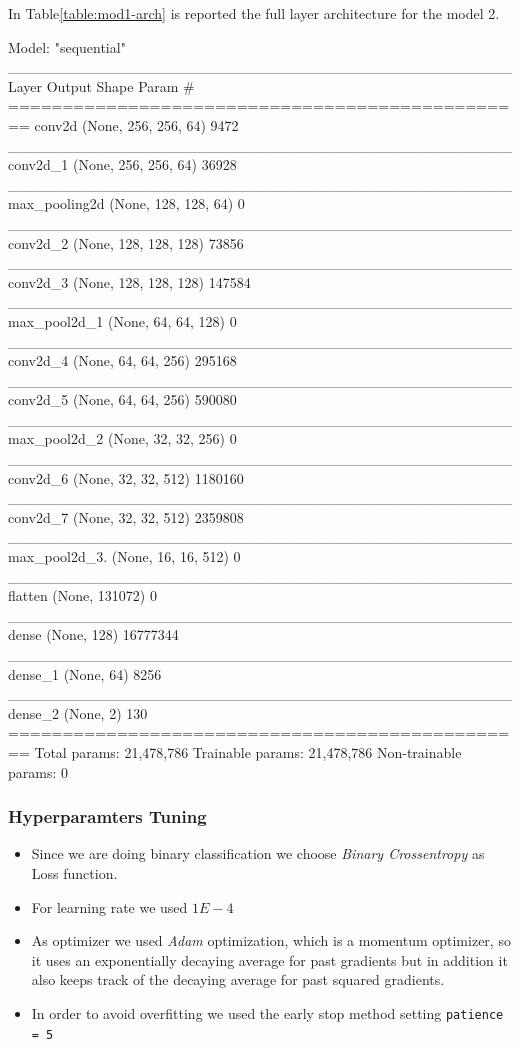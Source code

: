 \documentclass[conference]{IEEEtran}
\begin{document}
In Table\ref{table:mod1-arch} is reported the full layer architecture for the model 2.
\begin{table}[ht!] %
\centering
\caption{Layer Architecture}
\begin{verbnobox}[\fontsize{8pt}{8pt}\selectfont]
Model: "sequential"
________________________________________________
Layer           Output Shape           Param #   
================================================
conv2d         (None, 256, 256, 64)    9472      
________________________________________________
conv2d_1       (None, 256, 256, 64)    36928     
________________________________________________
max_pooling2d  (None, 128, 128, 64)    0         
________________________________________________
conv2d_2       (None, 128, 128, 128)   73856     
________________________________________________
conv2d_3       (None, 128, 128, 128)   147584    
________________________________________________
max_pool2d_1   (None, 64, 64, 128)     0         
________________________________________________
conv2d_4       (None, 64, 64, 256)     295168    
________________________________________________
conv2d_5       (None, 64, 64, 256)     590080    
________________________________________________
max_pool2d_2   (None, 32, 32, 256)     0         
________________________________________________
conv2d_6       (None, 32, 32, 512)     1180160   
________________________________________________
conv2d_7       (None, 32, 32, 512)     2359808   
________________________________________________
max_pool2d_3.  (None, 16, 16, 512)     0         
________________________________________________
flatten        (None, 131072)          0         
________________________________________________
dense          (None, 128)             16777344  
________________________________________________
dense_1        (None, 64)              8256      
________________________________________________
dense_2        (None, 2)               130       
================================================
Total params: 21,478,786
Trainable params: 21,478,786
Non-trainable params: 0
\end{verbnobox}
\label{table:mod1-arch}
\end{table}

\subsubsection{Hyperparamters Tuning}
\begin{itemize}
    \item Since we are doing binary classification we choose \textit{Binary Crossentropy} as Loss function.
    \item For learning rate we used $1E-4$
    \item As optimizer we used \textit{Adam} optimization, which is a momentum optimizer, so it uses an exponentially decaying average for past gradients but in addition it also keeps track of the decaying average for past squared gradients. 
    \item In order to avoid overfitting we used the early stop method setting \texttt{patience = 5}
\end{itemize}
\end{document}
